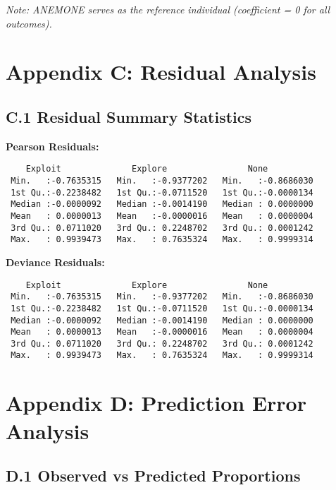 \documentclass[11pt,a4paper]{article}
\begin{document}
\textit{Note: ANEMONE serves as the reference individual (coefficient = 0 for all outcomes).}

\section{Appendix C: Residual Analysis}

\subsection{C.1 Residual Summary Statistics}

\textbf{Pearson Residuals:}
\begin{verbatim}
    Exploit              Explore                None           
 Min.   :-0.7635315   Min.   :-0.9377202   Min.   :-0.8686030  
 1st Qu.:-0.2238482   1st Qu.:-0.0711520   1st Qu.:-0.0000134  
 Median :-0.0000092   Median :-0.0014190   Median : 0.0000000  
 Mean   : 0.0000013   Mean   :-0.0000016   Mean   : 0.0000004  
 3rd Qu.: 0.0711020   3rd Qu.: 0.2248702   3rd Qu.: 0.0001242  
 Max.   : 0.9939473   Max.   : 0.7635324   Max.   : 0.9999314  
\end{verbatim}

\textbf{Deviance Residuals:}
\begin{verbatim}
    Exploit              Explore                None           
 Min.   :-0.7635315   Min.   :-0.9377202   Min.   :-0.8686030  
 1st Qu.:-0.2238482   1st Qu.:-0.0711520   1st Qu.:-0.0000134  
 Median :-0.0000092   Median :-0.0014190   Median : 0.0000000  
 Mean   : 0.0000013   Mean   :-0.0000016   Mean   : 0.0000004  
 3rd Qu.: 0.0711020   3rd Qu.: 0.2248702   3rd Qu.: 0.0001242  
 Max.   : 0.9939473   Max.   : 0.7635324   Max.   : 0.9999314  
\end{verbatim}

\section{Appendix D: Prediction Error Analysis}

\subsection{D.1 Observed vs Predicted Proportions}
\end{document}
